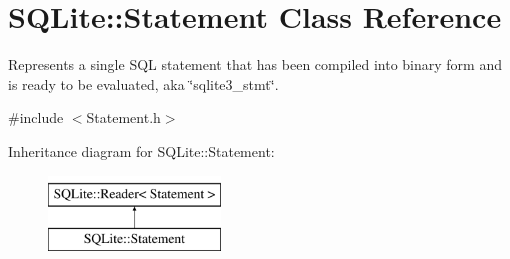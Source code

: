 \hypertarget{class_s_q_lite_1_1_statement}{\section{S\-Q\-Lite\-:\-:Statement Class Reference}
\label{class_s_q_lite_1_1_statement}
}


Represents a single S\-Q\-L statement that has been compiled into binary form and is ready to be evaluated, aka \char`\"{}sqlite3\-\_\-stmt\char`\"{}.  




{\ttfamily \#include $<$Statement.\-h$>$}

Inheritance diagram for S\-Q\-Lite\-:\-:Statement\-:\begin{figure}[H]
\begin{center}
\leavevmode
\includegraphics[height=2.000000cm]{class_s_q_lite_1_1_statement}
\end{center}
\end{figure}
